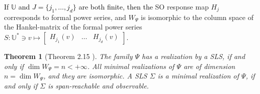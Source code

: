 \documentclass[journal,twoside,web]{ieeecolor}
\newtheorem{Theorem}{Theorem}[section]
\newcommand{\hankredu}{\mathcal{H}_{ \alpha, \beta }}
\begin{document}
 \textcolor{black}{If $\mathbb{U}$ and $J=\{j_1,\ldots,j_d\}$ 
 are both
 finite, then the}  SO response map $H_j$ corresponds to formal power series,
 and $W_{\Psi}$ is isomorphic to the column space of the Hankel-matrix
 \cite{MFliessHank,Reut:Book,Son:Real}
 of
 the formal power series $S:\mathbb{U}^{*} \ni v \mapsto \begin{bmatrix} H_{j_1}(v) & \ldots&  H_{j_d}(v) \end{bmatrix}$.
\begin{Theorem}[Theorem 2.15 \cite{Son:Real}]
\label{theo:real1}
      The family $\Psi$   
      has a realization by a SLS, if
      and only if $\dim W_{\Psi}=n <+\infty$.
      All minimal realizations of $\Psi$ are of dimension $n=\dim W_{\Psi}$, and 
      they are isomorphic.
      A SLS $\Sigma$ is a minimal realization of $\Psi$, if and only if 
      $\Sigma$ is span-reachable and observable. %
\end{Theorem}
\end{document}
